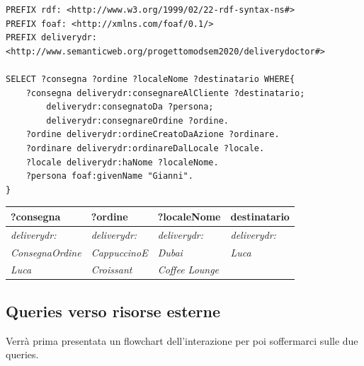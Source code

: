 \documentclass[12pt]{article}
\begin{document}
\begin{lstlisting}[language=SPARQL]
PREFIX rdf: <http://www.w3.org/1999/02/22-rdf-syntax-ns#>
PREFIX foaf: <http://xmlns.com/foaf/0.1/>
PREFIX deliverydr:
<http://www.semanticweb.org/progettomodsem2020/deliverydoctor#>

SELECT ?consegna ?ordine ?localeNome ?destinatario WHERE{
    ?consegna deliverydr:consegnareAlCliente ?destinatario;
        deliverydr:consegnatoDa ?persona;
        deliverydr:consegnareOrdine ?ordine.
    ?ordine deliverydr:ordineCreatoDaAzione ?ordinare.
    ?ordinare deliverydr:ordinareDalLocale ?locale.
    ?locale deliverydr:haNome ?localeNome.
    ?persona foaf:givenName "Gianni".
}
\end{lstlisting}
\begin{tabularx}{\textwidth} { 
  | >{\centering\arraybackslash}X 
  | >{\centering\arraybackslash}X
  | >{\centering\arraybackslash}X
  | >{\centering\arraybackslash}X |}
 \hline
 \textbf{?consegna} & \textbf{?ordine} & \textbf{?localeNome} & \textbf{destinatario} \\
 \hline
 \textit{deliverydr:} & \textit{deliverydr:} & \textit{deliverydr:} & \textit{deliverydr:}  \\
 \textit{ConsegnaOrdine} & \textit{CappuccinoE}& \textit{Dubai} & \textit{Luca}\\
 \textit{Luca} & \textit{Croissant} & \textit{Coffee Lounge}& \\
\hline
\end{tabularx}
\newline
\newline

\subsection{Queries verso risorse esterne}
Verrà prima presentata un flowchart dell'interazione per poi soffermarci sulle due queries.
\end{document}
